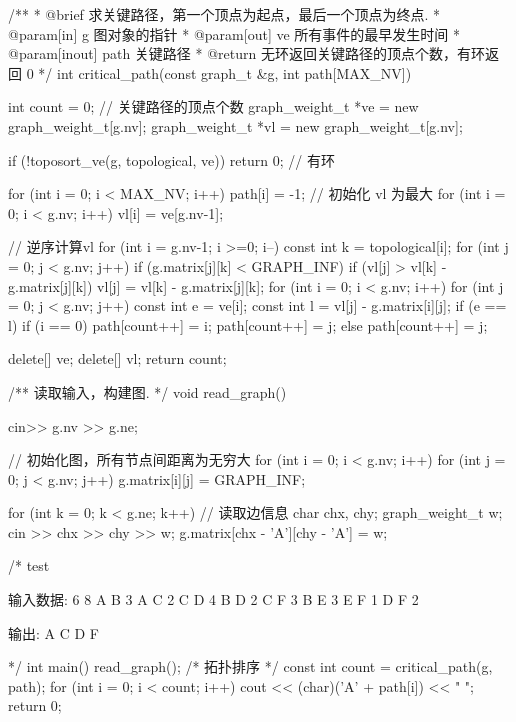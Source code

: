\begin{Codex}[label=am_graph_critical_path.cpp]
/**
  * @brief 求关键路径，第一个顶点为起点，最后一个顶点为终点.
  * @param[in] g 图对象的指针
  * @param[out] ve 所有事件的最早发生时间
  * @param[inout] path 关键路径
  * @return 无环返回关键路径的顶点个数，有环返回 0
  */
int critical_path(const graph_t &g, int path[MAX_NV]) {
    int count = 0;    // 关键路径的顶点个数
    graph_weight_t *ve = new graph_weight_t[g.nv];
    graph_weight_t *vl = new graph_weight_t[g.nv];

    if (!toposort_ve(g, topological, ve)) return 0;  // 有环

    for (int i = 0; i < MAX_NV; i++) path[i] = -1;
    // 初始化 vl 为最大
    for (int i = 0; i < g.nv; i++) vl[i] = ve[g.nv-1];

    // 逆序计算vl
    for (int i = g.nv-1; i >=0; i--) {
        const int k = topological[i];
        for (int j = 0; j < g.nv; j++) {
            if (g.matrix[j][k] < GRAPH_INF) {
                if (vl[j] > vl[k] - g.matrix[j][k])
                    vl[j] = vl[k] - g.matrix[j][k];
            }
        }
    }
    for (int i = 0; i < g.nv; i++) {
        for (int j = 0; j < g.nv; j++) {
            const int e = ve[i];
            const int l = vl[j] - g.matrix[i][j];
            if (e == l) {
                if (i == 0) {
                    path[count++] = i;
                    path[count++] = j;
                } else {
                    path[count++] = j;
                }
            }
        }
    }

    delete[] ve;
    delete[] vl;
    return count;
}

/** 读取输入，构建图. */
void read_graph() {
    cin>> g.nv >> g.ne;

    // 初始化图，所有节点间距离为无穷大
    for (int i = 0; i < g.nv; i++)
        for (int j = 0; j < g.nv; j++)
            g.matrix[i][j] = GRAPH_INF;

    for (int k = 0; k < g.ne; k++) {  // 读取边信息
        char chx, chy;
        graph_weight_t w;
        cin >> chx >> chy >> w;
        g.matrix[chx - 'A'][chy - 'A'] = w;
    }
}

/* test

输入数据:
6 8
A B 3
A C 2
C D 4
B D 2
C F 3
B E 3
E F 1
D F 2

输出: A C D F

*/
int main() {
    read_graph();
    /* 拓扑排序 */
    const int count = critical_path(g, path);
    for (int i = 0; i < count; i++) {
        cout << (char)('A' + path[i]) << " ";
    }
    return 0;
}
\end{Codex}

